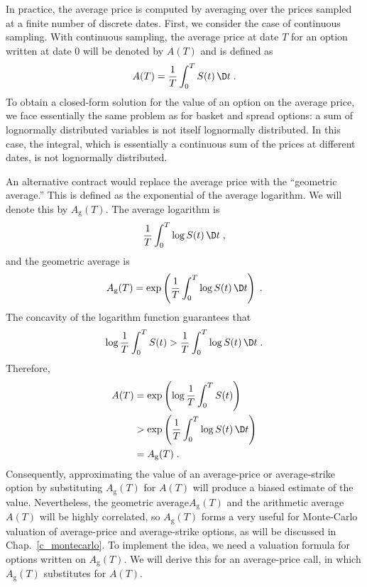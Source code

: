 In practice, the average price is computed by averaging over the prices sampled at a finite number of discrete dates.  First, we consider the case of continuous sampling.  With continuous sampling, the average price at date $T$ for an option written at date 0 will be denoted by $A(T)$ and is defined as
$$A(T) = \frac{1}{T}\int_0^T S(t)\,\D t\; .$$
To obtain a closed-form solution for the value of an option on the average price, we face essentially the same problem as for basket and spread options:  a sum of lognormally distributed variables is not itself lognormally distributed.  In this case, the integral, which is essentially a continuous sum of the prices at different dates, is not lognormally distributed.  

An alternative contract would replace the average price with the ``geometric average.''    This is defined as the exponential of the average logarithm.  We will denote this by $A_\text{g}(T)$.  The average logarithm is
$$\frac{1}{T}\int_0^T \log S(t)\,\D t\; ,$$
and the geometric average is
$$A_\text{g}(T) = \exp\left(\frac{1}{T}\int_0^T \log S(t)\,\D t\right)\; .$$
The concavity of the logarithm function guarantees that
$$\log \frac{1}{T}\int_0^T S(t) > \frac{1}{T}\int_0^T \log S(t)\,\D t \; .$$
Therefore,
\begin{align*}
A(T) &= \exp\left(\log \frac{1}{T}\int_0^T S(t)\right)\\
&> \exp\left(\frac{1}{T}\int_0^T \log S(t)\,\D t\right) \\
&= A_\text{g}(T)\; .
\end{align*}
Consequently, approximating the value of an average-price or average-strike option by substituting $A_\text{g}(T)$ for $A(T)$ will produce a biased estimate of the value.  Nevertheless, the geometric average$A_\text{g}(T)$ and the arithmetic average $A(T)$ will be highly correlated, so $A_\text{g}(T)$ forms a very useful  for Monte-Carlo valuation of average-price and average-strike options, as will be discussed in Chap.~\ref{c_montecarlo}.  To implement the idea, we need a valuation formula for options written on $A_\text{g}(T)$.  We will derive this for an average-price call, in which $A_\text{g}(T)$ substitutes for $A(T)$.

